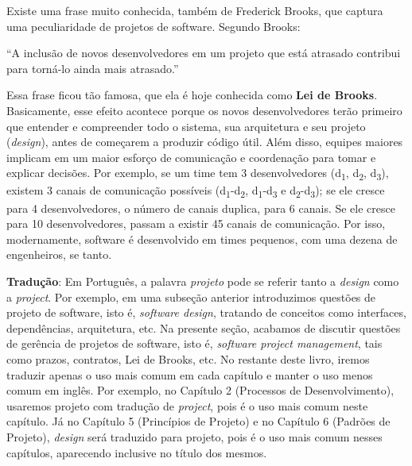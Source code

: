 \documentclass[
  11pt,
  twoside]{book}
\renewenvironment{quote}{\centering \vspace{1.5ex} \begin{tcolorbox}[colback=backcolor, width=4.9in]}{\end{tcolorbox}}
\begin{document}
 Existe uma frase muito conhecida, também de
Frederick Brooks, que captura uma peculiaridade de projetos de software.
Segundo Brooks:

\begin{quote}
``A inclusão de novos desenvolvedores em um projeto que está atrasado
contribui para torná-lo ainda mais atrasado.''
\end{quote}

  Essa
frase ficou tão famosa, que ela é hoje conhecida como \textbf{Lei de
Brooks}. Basicamente, esse efeito acontece porque os novos
desenvolvedores terão primeiro que entender e compreender todo o
sistema, sua arquitetura e seu projeto (\emph{design}), antes de
começarem a produzir código útil. Além disso, equipes maiores implicam
em um maior esforço de comunicação e coordenação para tomar e explicar
decisões. Por exemplo, se um time tem 3 desenvolvedores
(d\textsubscript{1}, d\textsubscript{2}, d\textsubscript{3}), existem 3
canais de comunicação possíveis (d\textsubscript{1}-d\textsubscript{2},
d\textsubscript{1}-d\textsubscript{3} e
d\textsubscript{2}-d\textsubscript{3}); se ele cresce para 4
desenvolvedores, o número de canais duplica, para 6 canais. Se ele
cresce para 10 desenvolvedores, passam a existir 45 canais de
comunicação. Por isso, modernamente, software é desenvolvido em times
pequenos, com uma dezena de engenheiros, se tanto.

\textbf{Tradução}: Em Português, a palavra \emph{projeto} pode se
referir tanto a \emph{design} como a \emph{project}. Por exemplo, em uma
subseção anterior introduzimos questões de projeto de software, isto é,
\emph{software design}, tratando de conceitos como interfaces,
dependências, arquitetura, etc. Na presente seção, acabamos de discutir
questões de gerência de projetos de software, isto é, \emph{software
project management}, tais como prazos, contratos, Lei de Brooks, etc. No
restante deste livro, iremos traduzir apenas o uso mais comum em cada
capítulo e manter o uso menos comum em inglês. Por exemplo, no Capítulo
2 (Processos de Desenvolvimento), usaremos projeto com tradução de
\emph{project}, pois é o uso mais comum neste capítulo. Já no Capítulo 5
(Princípios de Projeto) e no Capítulo 6 (Padrões de Projeto),
\emph{design} será traduzido para projeto, pois é o uso mais comum
nesses capítulos, aparecendo inclusive no título dos mesmos.
\end{document}
